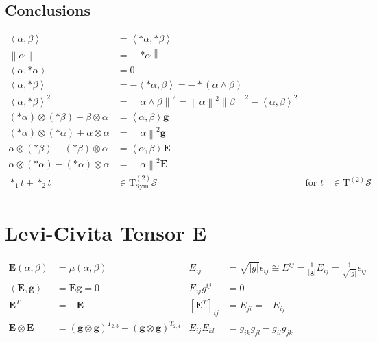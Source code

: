 \documentclass[a4paper,10pt]{scrartcl}
\newcommand{\surf}{\mathcal{S}}
\newcommand{\T}{\mathrm{T}}
\newcommand{\tps}[1]{\T^{(#1)}\surf}
\newcommand{\tts}{\tps{2}}
\newcommand{\tpsprop}[2]{\T^{(#1)}_{#2}\surf}
\newcommand{\ttssym}{\tpsprop{2}{\mathrm{Sym}}}
\newcommand{\volval}{\sqrt{| g |}}
\newcommand{\gb}{\mathbf{g}}
\newcommand{\Eb}{\mathbf{E}}
\begin{document}
\subsection{Conclusions}
  \begin{align*}
    \left\langle \alpha, \beta \right\rangle &= \left\langle *\alpha , *\beta \right\rangle \\
    \left\| \alpha \right\| &= \left\| *\alpha \right\|\\
    \left\langle \alpha, *\alpha \right\rangle &= 0 \\
    \left\langle \alpha, *\beta \right\rangle &= -\left\langle *\alpha , \beta \right\rangle = -*\left( \alpha \wedge \beta \right)\\
    \left\langle \alpha, *\beta \right\rangle^{2} &= \left\| \alpha \wedge \beta \right\|^{2}
                                                    =\left\| \alpha \right\|^{2}\left\| \beta \right\|^{2} - \left\langle \alpha, \beta \right\rangle^{2}\\
    (*\alpha)\otimes(*\beta) + \beta\otimes\alpha &= \left\langle \alpha, \beta \right\rangle \gb \\
    (*\alpha)\otimes(*\alpha) + \alpha\otimes\alpha &= \left\| \alpha \right\|^{2} \gb \\
    \alpha\otimes(*\beta) - (*\beta)\otimes\alpha &= \left\langle \alpha, \beta \right\rangle \Eb \\
    \alpha\otimes(*\alpha) - (*\alpha)\otimes\alpha &=  \left\| \alpha \right\|^{2} \Eb\\
    *_{1}t+*_{2}t &\in \ttssym &\text{for } t &\in\tts
  \end{align*}

\section{Levi-Civita Tensor \( \Eb \)}

\begin{align*}
  \Eb(\alpha,\beta) &= \mu(\alpha,\beta)
          &E_{ij} &= \sqrt{|g|}\epsilon_{ij}
              \cong E^{ij} = \frac{1}{|\gb|}E_{ij} = \frac{1}{\volval}\epsilon_{ij} \\
  \left\langle \Eb, \gb \right\rangle &= \Eb\gb = 0
          &E_{ij}g^{ij} &= 0\\
  \Eb^{T} &= -\Eb 
           &\left[ \Eb^{T} \right]_{ij} &= E_{ji} = -E_{ij} \\
  \Eb\otimes\Eb &= \left( \gb\otimes\gb\right)^{T_{2,3}} - \left( \gb\otimes\gb\right)^{T_{2,4}}
           &E_{ij}E_{kl} &= g_{ik}g_{jl} - g_{il}g_{jk}
\end{align*}
\end{document}
